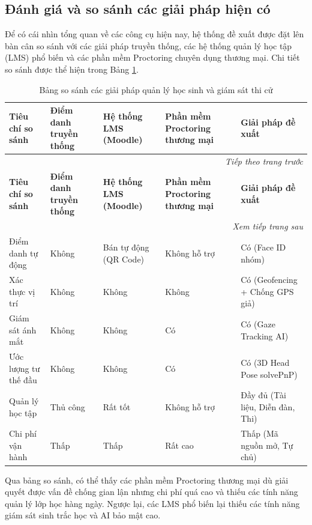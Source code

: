 \documentclass[../DoAn.tex]{subfiles}
\begin{document}
\subsection{Đánh giá và so sánh các giải pháp hiện có}

\label{subsection:2.1.3}

Để có cái nhìn tổng quan về các công cụ hiện nay, hệ thống đề xuất được đặt lên bàn cân so sánh với các giải pháp truyền thống, các hệ thống quản lý học tập (LMS) phổ biến và các phần mềm Proctoring chuyên dụng thương mại. Chi tiết so sánh được thể hiện trong Bảng \ref{table:comparison_solutions}.

\begin{longtable}{|p{3.2cm}|p{2.2cm}|p{2.8cm}|p{3.2cm}|p{2.8cm}|}
    \caption{Bảng so sánh các giải pháp quản lý học sinh và giám sát thi cử}
    \label{table:comparison_solutions}\\
        \hline
        \textbf{Tiêu chí so sánh} & \textbf{Điểm danh truyền thống} & \textbf{Hệ thống LMS (Moodle)} & \textbf{Phần mềm Proctoring thương mại} & \textbf{Giải pháp đề xuất} \\ \hline
    \endfirsthead
    \multicolumn{5}{r}{\textit{Tiếp theo trang trước}} \\
    \hline
    \textbf{Tiêu chí so sánh} & \textbf{Điểm danh truyền thống} & \textbf{Hệ thống LMS (Moodle)} & \textbf{Phần mềm Proctoring thương mại} & \textbf{Giải pháp đề xuất} \\ \hline
    \endhead
    \hline
    \multicolumn{5}{r}{\textit{Xem tiếp trang sau}} \\
    \endfoot
    \hline
    \endlastfoot
        Điểm danh tự động & Không & Bán tự động (QR Code) & Không hỗ trợ & Có (Face ID nhóm) \\ \hline
        Xác thực vị trí & Không & Không & Không & Có (Geofencing + Chống GPS giả) \\ \hline
        Giám sát ánh mắt & Không & Không & Có & Có (Gaze Tracking AI) \\ \hline
        Ước lượng tư thế đầu & Không & Không & Có & Có (3D Head Pose solvePnP) \\ \hline
        Quản lý học tập & Thủ công & Rất tốt & Không hỗ trợ & Đầy đủ (Tài liệu, Diễn đàn, Thi) \\ \hline
        Chi phí vận hành & Thấp & Thấp & Rất cao & Thấp (Mã nguồn mở, Tự chủ) \\ \hline
\end{longtable}

Qua bảng so sánh, có thể thấy các phần mềm Proctoring thương mại dù giải quyết được vấn đề chống gian lận nhưng chi phí quá cao và thiếu các tính năng quản lý lớp học hàng ngày. Ngược lại, các LMS phổ biến lại thiếu các tính năng giám sát sinh trắc học và AI bảo mật cao.
\end{document}
